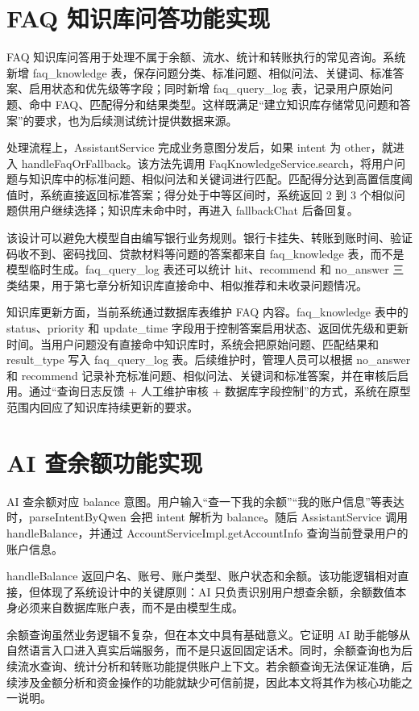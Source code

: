 \documentclass[bachelor, print]{xduthesis}
\begin{document}
\section{FAQ 知识库问答功能实现}

FAQ 知识库问答用于处理不属于余额、流水、统计和转账执行的常见咨询。系统新增 faq\_knowledge 表，保存问题分类、标准问题、相似问法、关键词、标准答案、启用状态和优先级等字段；同时新增 faq\_query\_log 表，记录用户原始问题、命中 FAQ、匹配得分和结果类型。这样既满足“建立知识库存储常见问题和答案”的要求，也为后续测试统计提供数据来源。

处理流程上，AssistantService 完成业务意图分发后，如果 intent 为 other，就进入 handleFaqOrFallback。该方法先调用 FaqKnowledgeService.search，将用户问题与知识库中的标准问题、相似问法和关键词进行匹配。匹配得分达到高置信度阈值时，系统直接返回标准答案；得分处于中等区间时，系统返回 2 到 3 个相似问题供用户继续选择；知识库未命中时，再进入 fallbackChat 后备回复。

该设计可以避免大模型自由编写银行业务规则。银行卡挂失、转账到账时间、验证码收不到、密码找回、贷款材料等问题的答案都来自 faq\_knowledge 表，而不是模型临时生成。faq\_query\_log 表还可以统计 hit、recommend 和 no\_answer 三类结果，用于第七章分析知识库直接命中、相似推荐和未收录问题情况。

知识库更新方面，当前系统通过数据库表维护 FAQ 内容。faq\_knowledge 表中的 status、priority 和 update\_time 字段用于控制答案启用状态、返回优先级和更新时间。当用户问题没有直接命中知识库时，系统会把原始问题、匹配结果和 result\_type 写入 faq\_query\_log 表。后续维护时，管理人员可以根据 no\_answer 和 recommend 记录补充标准问题、相似问法、关键词和标准答案，并在审核后启用。通过“查询日志反馈 + 人工维护审核 + 数据库字段控制”的方式，系统在原型范围内回应了知识库持续更新的要求。

\section{AI 查余额功能实现}

AI 查余额对应 balance 意图。用户输入“查一下我的余额”“我的账户信息”等表达时，parseIntentByQwen 会把 intent 解析为 balance。随后 AssistantService 调用 handleBalance，并通过 AccountServiceImpl.getAccountInfo 查询当前登录用户的账户信息。

handleBalance 返回户名、账号、账户类型、账户状态和余额。该功能逻辑相对直接，但体现了系统设计中的关键原则：AI 只负责识别用户想查余额，余额数值本身必须来自数据库账户表，而不是由模型生成。

余额查询虽然业务逻辑不复杂，但在本文中具有基础意义。它证明 AI 助手能够从自然语言入口进入真实后端服务，而不是只返回固定话术。同时，余额查询也为后续流水查询、统计分析和转账功能提供账户上下文。若余额查询无法保证准确，后续涉及金额分析和资金操作的功能就缺少可信前提，因此本文将其作为核心功能之一说明。
\end{document}
